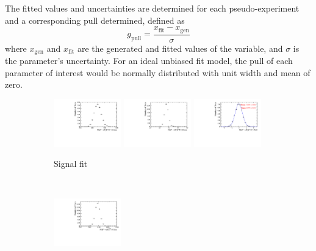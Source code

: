 The fitted values and uncertainties are determined for each pseudo-experiment and a corresponding pull determined, defined as
\begin{equation}
g_{\text{pull}} = \frac{x_{\text{fit}} - x_{\text{gen}} }{\sigma}
\end{equation}
where $x_{\text{gen}}$ and $x_{\text{fit}}$ are the generated and fitted values of the variable, and $\sigma$ is the parameter's uncertainty.
For an ideal unbiased fit model, the pull of each parameter of interest would be normally distributed with unit width and mean of zero.  


\begin{figure}[!h]
   \centering
   \begin{subfigure}[t]{1.0\textwidth}
      \includegraphics[width=0.32\textwidth]{figs/B2DsKK/Plots_DsKK_nsig_val.pdf}
      \includegraphics[width=0.32\textwidth]{figs/B2DsKK/Plots_DsKK_nsig_err.pdf}
      \includegraphics[width=0.32\textwidth]{figs/B2DsKK/Plots_DsKK_nsig_pul.pdf}
      \caption{Signal fit}
   \end{subfigure}\\
   \begin{subfigure}[t]{1.0\textwidth}
      \includegraphics[width=0.32\textwidth]{figs/B2DsKK/Plots_DsD0_nsig_val.pdf}

\end{subfigure}
\end{figure}
